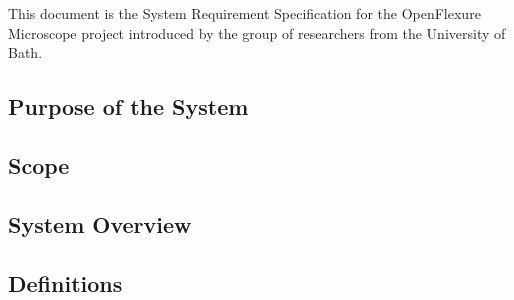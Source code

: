This document is the System Requirement Specification for the OpenFlexure Microscope project introduced by the group of researchers from the University of Bath.

\subsection{Purpose of the System}


\subsection{Scope}


\subsection{System Overview}


\subsection{Definitions}
